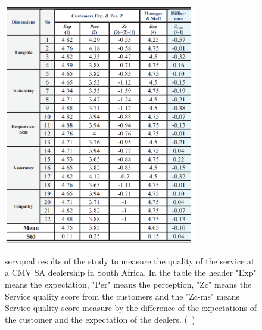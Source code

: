   \begin{figure}[h]
    \caption{\ac{servqual} results of the study to measure the quality of the service at a CMV SA dealership in South Africa. In the table the header "Exp" means the expectation, "Per" means the perception, "Zc" means the Service quality score from the customers and the "Zc-ms" means Service quality score measure by the difference of the expectations of the customer and the expectation of the dealers. (~\cite{Measuring_After_sales_Service_Quality})}
    \centering
    \includegraphics[width=0.75\textwidth]{figs/SERVQUAL_results}
    \label{fig:SERVQUAL_results}
  \end{figure}
  